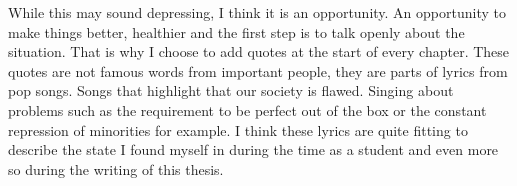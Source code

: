 While this may sound depressing, I think it is an opportunity.
An opportunity to make things better, healthier and the first step is to talk openly about the situation.
That is why I choose to add quotes at the start of every chapter.
These quotes are not famous words from important people, they are parts of lyrics from pop songs.
Songs that highlight that our society is flawed.
Singing about problems such as the requirement to be perfect out of the box or the constant repression of minorities for example.
I think these lyrics are quite fitting to describe the state I found myself in during the time as a student and even more so during the writing of this thesis.

